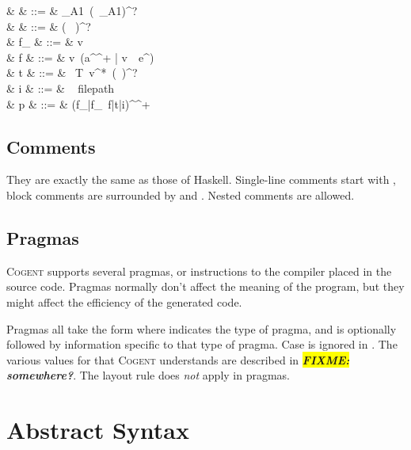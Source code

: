 \documentclass[a4paper]{article}
\newcommand{\FIXME}[1]{\textbf{\textsl{\colorbox{yellow}{FIXME:} #1}}}
\newcommand{\fixme}[1]{\FIXME{#1}}
\newcommand{\cogent}{\textsc{Cogent}\xspace}
\begin{document}
{\begin{grammar}
                    & \tau         & ::= & \tau_{A1}\ (\code{->}\ \tau_{A1})^? \\
                    & \sigma       & ::= & (\  )^?\ \tau\\
           & f_{\sigma}   & ::= & v\ \code{:}\ \sigma \\
          & f            & ::= & v\ ({a^{}}^+ | v\ \code{=}\ e^{})  \\
              & t            & ::= & \ T\ v^*\ (\code{=}\ \tau)^? \\
                      & i            & ::= & \  filepath  \\
                      & p            & ::= & {(f_{\sigma}|f_{\sigma}\ f|t|i)^{}}^+
\end{grammar}
}

\subsection{Comments}
They are exactly the same as those of Haskell. Single-line comments start with \code{-}\code{-},
block comments are surrounded by \code{\{-} and \code{-\}}. Nested comments are allowed.

\subsection{Pragmas}

\cogent supports several pragmas, or instructions to the compiler placed in the source code.
Pragmas normally don't affect the meaning of the program, but they might affect the efficiency of the generated code.

Pragmas all take the form  where  indicates the type of pragma,
and is optionally followed by information specific to that type of pragma. Case is ignored in .
The various values for  that \cogent understands are described in \fixme{somewhere?}.
The layout rule does \emph{not} apply in pragmas.


\section{Abstract Syntax}
\end{document}
